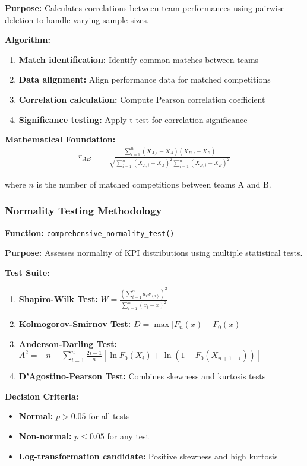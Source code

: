 \textbf{Purpose:} Calculates correlations between team performances using pairwise deletion to handle varying sample sizes.

\textbf{Algorithm:}
\begin{enumerate}
    \item \textbf{Match identification:} Identify common matches between teams
    \item \textbf{Data alignment:} Align performance data for matched competitions
    \item \textbf{Correlation calculation:} Compute Pearson correlation coefficient
    \item \textbf{Significance testing:} Apply t-test for correlation significance
\end{enumerate}

\textbf{Mathematical Foundation:}
\begin{align}
r_{AB} &= \frac{\sum_{i=1}^{n} (X_{A,i} - \bar{X}_A)(X_{B,i} - \bar{X}_B)}{\sqrt{\sum_{i=1}^{n} (X_{A,i} - \bar{X}_A)^2 \sum_{i=1}^{n} (X_{B,i} - \bar{X}_B)^2}}
\end{align}

where $n$ is the number of matched competitions between teams A and B.

\subsubsection{Normality Testing Methodology}

\textbf{Function:} \texttt{comprehensive\_normality\_test()}

\textbf{Purpose:} Assesses normality of KPI distributions using multiple statistical tests.

\textbf{Test Suite:}
\begin{enumerate}
    \item \textbf{Shapiro-Wilk Test:} $W = \frac{(\sum_{i=1}^{n} a_i x_{(i)})^2}{\sum_{i=1}^{n} (x_i - \bar{x})^2}$
    \item \textbf{Kolmogorov-Smirnov Test:} $D = \max |F_n(x) - F_0(x)|$
    \item \textbf{Anderson-Darling Test:} $A^2 = -n - \sum_{i=1}^{n} \frac{2i-1}{n}[\ln F_0(X_i) + \ln(1-F_0(X_{n+1-i}))]$
    \item \textbf{D'Agostino-Pearson Test:} Combines skewness and kurtosis tests
\end{enumerate}

\textbf{Decision Criteria:}
\begin{itemize}
    \item \textbf{Normal:} $p > 0.05$ for all tests
    \item \textbf{Non-normal:} $p \leq 0.05$ for any test
    \item \textbf{Log-transformation candidate:} Positive skewness and high kurtosis
\end{itemize}

